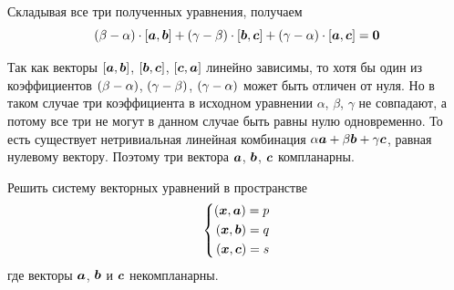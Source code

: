 \documentclass[a4paper,12pt]{article}
\begin{document}
\begin{solution}
    Складывая все три полученных уравнения, получаем
    \[
      (\beta - \alpha) \cdot [\boldsymbol a, \boldsymbol b] + (\gamma - \beta) \cdot [\boldsymbol b, \boldsymbol c] + (\gamma - \alpha) \cdot [\boldsymbol a, \boldsymbol c] = \boldsymbol 0
    \]
    
    Так как векторы $[\boldsymbol a, \boldsymbol b]$, $[\boldsymbol b, \boldsymbol c]$, $[\boldsymbol c, \boldsymbol a]$ линейно зависимы, то хотя бы один из коэффициентов $(\beta \hm- \alpha)$, $(\gamma \hm- \beta)$, $(\gamma \hm- \alpha)$ может быть отличен от нуля.
    Но в таком случае три коэффициента в исходном уравнении $\alpha$, $\beta$, $\gamma$ не совпадают, а потому все три не могут в данном случае быть равны нулю одновременно.
    То есть существует нетривиальная линейная комбинация $\alpha \bds a \hm+ \beta \bds b \hm+ \gamma \bds c$, равная нулевому вектору.
    Поэтому три вектора $\boldsymbol a$, $\boldsymbol b$, $\boldsymbol c$ компланарны.
  \end{solution}

  
  \begin{problem}[3.31]
    Решить систему векторных уравнений в пространстве
    \[
      \left\{
        \begin{aligned}
          (\boldsymbol x, \boldsymbol a) = p\\
          (\boldsymbol x, \boldsymbol b) = q\\
          (\boldsymbol x, \boldsymbol c) = s
        \end{aligned}
      \right.
    \]
    где векторы $\boldsymbol a$, $\boldsymbol b$ и $\boldsymbol c$ некомпланарны.
  \end{problem}
  
\end{document}

